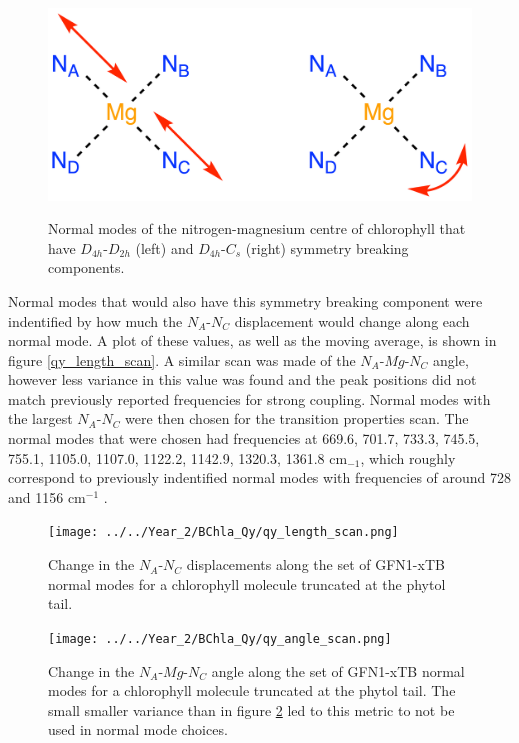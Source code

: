 \begin{figure}[]
    \centering
    \includegraphics[scale=1.5]{chapters/chl_xtb/D4h_symmetry.png}
    \label{fig:D4_sym_breaking}
    \caption{Normal modes of the nitrogen-magnesium centre of chlorophyll that have
    $D_{4h}$-$D_{2h}$ (left) and $D_{4h}$-$C_{s}$ (right) symmetry breaking components.}
\end{figure}

Normal modes that would also have this symmetry breaking component were indentified
by how much the $N_A$-$N_C$ displacement would change along each normal mode. A plot of these
values, as well as the moving average, is shown in figure \ref{qy_length_scan}.
A similar scan was made of the $N_A$-$Mg$-$N_C$ angle, however less variance in
this value was found and the peak positions did not match previously reported frequencies
for strong coupling. Normal modes with the largest $N_A$-$N_C$ were then chosen 
for the transition properties scan. The normal modes that were chosen had frequencies 
at 669.6, 701.7, 733.3, 745.5, 755.1, 1105.0, 1107.0, 1122.2, 1142.9, 1320.3, 1361.8 
$\text{cm}_{-1}$, which roughly correspond to previously indentified normal modes
with frequencies of around 728 and 1156 $\text{cm}^{-1}$ \cite{Kim2020}.

\begin{figure}
    \centering
    \texttt{[image: ../../Year\_2/BChla\_Qy/qy\_length\_scan.png]}
    \label{fig:qy_length_scan}
    \caption{Change in the $N_A$-$N_C$ displacements along the set of GFN1-xTB 
    normal modes for a chlorophyll molecule truncated at the phytol tail.}
\end{figure}

\begin{figure}
    \centering
    \texttt{[image: ../../Year\_2/BChla\_Qy/qy\_angle\_scan.png]}
    \label{fig:qy_angle_scan}
    \caption{Change in the $N_A$-$Mg$-$N_C$ angle along the set of GFN1-xTB normal
    modes for a chlorophyll molecule truncated at the phytol tail. The small smaller
    variance than in figure \ref{fig:qy_length_scan} led to this metric to not be
    used in normal mode choices.}
\end{figure}


